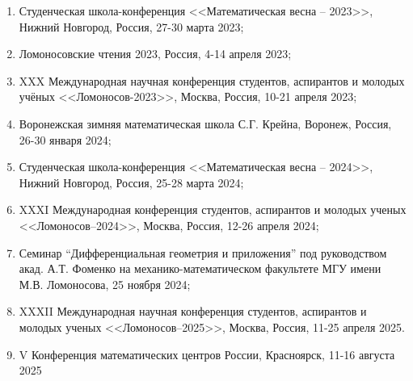 \begin{enumerate}%
\item Студенческая школа-конференция <<Математическая весна --  2023>>, Нижний Новгород, Россия, 27-30 марта 2023;

\item Ломоносовские чтения 2023, Россия, 4-14 апреля 2023;

\item XXX Международная научная конференция студентов, аспирантов и молодых учёных <<Ломоносов-2023>>,  Москва, Россия, 10-21 апреля 2023;

\item Воронежская зимняя математическая школа С.Г. Крейна, Воронеж, Россия, 26-30 января 2024;

\item Студенческая школа-конференция <<Математическая весна -- 2024>>, Нижний Новгород, Россия, 25-28 марта 2024;

\item XXXI Международная конференция студентов, аспирантов и молодых ученых <<Ломоносов--2024>>, Москва, Россия, 12-26 апреля 2024;

\item Семинар “Дифференциальная геометрия и приложения” под руководством акад. А.Т. Фоменко на механико-математическом факультете МГУ имени М.В. Ломоносова, 25 ноября 2024;


\item XXXII Международная научная конференция студентов, аспирантов и молодых ученых <<Ломоносов--2025>>, Москва, Россия, 11-25 апреля 2025.

\item V Конференция математических центров России, Красноярск, 11-16 августа 2025


\end{enumerate}


